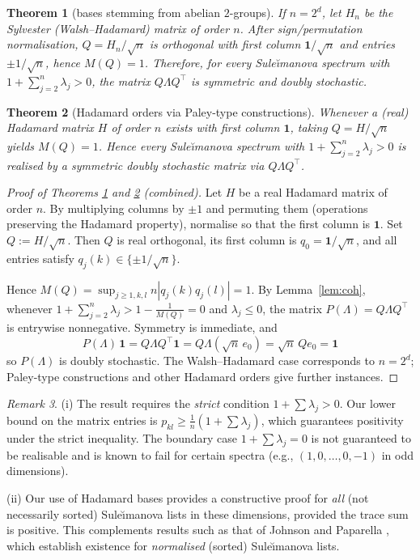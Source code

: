 \documentclass[12pt,fleqn]{amsart}
\renewcommand{\le}{\leqslant}
\renewcommand{\ge}{\geqslant}
\newtheorem{thm}{Theorem}
\theoremstyle{remark}
\newtheorem{rem}[thm]{Remark}
\newcommand{\1}{\mathbf{1}}
\newcommand{\Lam}{\Lambda}
\begin{document}
\begin{thm}[bases stemming from abelian $2$-groups]\label{thm:hypercube}
If $n=2^d$, let $H_n$ be the Sylvester (Walsh--Hadamard) matrix of order $n$. After sign/permutation normalisation, $Q=H_n/\sqrt n$ is orthogonal with first column $\1/\sqrt n$ and entries $\pm 1/\sqrt n$, hence $M(Q)=1$. Therefore, for \emph{every} Sule\u{\i}manova spectrum with $1+\sum_{j=2}^n\lambda_j>0$, the matrix $Q\Lam Q^\top$ is symmetric and doubly stochastic.
\end{thm}

\begin{thm}[Hadamard orders via Paley-type constructions]\label{thm:hadamard}
Whenever a (real) Hadamard matrix $H$ of order $n$ exists with first column $\1$, taking $Q=H/\sqrt n$ yields $M(Q)=1$. Hence every Sule\u{\i}manova spectrum with $1+\sum_{j=2}^n\lambda_j>0$ is realised by a symmetric doubly stochastic matrix via $Q\Lam Q^\top$.
\end{thm}

\begin{proof}[Proof of Theorems \ref{thm:hypercube} and \ref{thm:hadamard} (combined)]
Let $H$ be a real Hadamard matrix of order $n$. By multiplying columns by $\pm1$ and permuting them (operations preserving the Hadamard property), normalise so that the first column is $\1$. Set $Q:=H/\sqrt n$. Then $Q$ is real orthogonal, its first column is $q_0=\1/\sqrt n$, and all entries satisfy $q_j(k)\in\{\pm 1/\sqrt n\}$.

Hence $M(Q)=\sup_{j\ge1,k,l}n|q_j(k)q_j(l)|=1$. By Lemma~\ref{lem:coh}, whenever $1+\sum_{j=2}^n\lambda_j>1-\tfrac1{M(Q)}=0$ and $\lambda_j\le 0$, the matrix $P(\Lambda)=Q\Lambda Q^\top$ is entrywise nonnegative. Symmetry is immediate, and
\[
P(\Lambda)\,\1=Q\Lambda Q^\top\1=Q\Lambda(\sqrt n\,e_0)=\sqrt n\,Qe_0=\1
\]
so $P(\Lambda)$ is doubly stochastic. The Walsh--Hadamard case corresponds to $n=2^d$; Paley-type constructions and other Hadamard orders give further instances.
\end{proof}

\begin{rem}
(i) The result requires the \emph{strict} condition $1+\sum\lambda_j>0$. Our lower bound on the matrix entries is $p_{kl}\ge \tfrac{1}{n}(1+\sum\lambda_j)$, which guarantees positivity under the strict inequality. The boundary case $1+\sum\lambda_j=0$ is not guaranteed to be realisable and is known to fail for certain spectra (e.g., $(1,0,\dots,0,-1)$ in odd dimensions).

(ii) Our use of Hadamard bases provides a constructive proof for \emph{all} (not necessarily sorted) Sule\u{\i}manova lists in these dimensions, provided the trace sum is positive. This complements results such as that of Johnson and Paparella \cite{JP16}, which establish existence for \emph{normalised} (sorted) Sule\u{\i}manova lists.
\end{rem}
\end{document}
